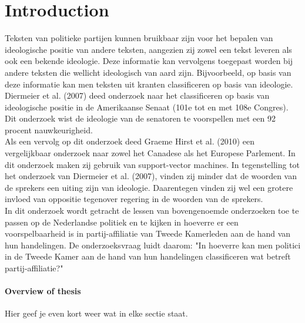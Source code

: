 \section{Introduction}
\label{sec:intro}
Teksten van politieke partijen kunnen bruikbaar zijn voor het bepalen van ideologische positie van andere teksten, aangezien zij zowel een tekst leveren als ook een bekende ideologie. Deze informatie kan vervolgens toegepast worden bij andere teksten die wellicht ideologisch van aard zijn. Bijvoorbeeld, op basis van deze informatie kan men teksten uit kranten classificeren op basis van ideologie.\\

Diermeier et al. (2007) deed onderzoek naar het classificeren op basis van ideologische positie in de Amerikaanse Senaat (101e tot en met 108e Congres). Dit onderzoek wist de ideologie van de senatoren te voorspellen met een 92 procent nauwkeurigheid.\\
Als een vervolg op dit onderzoek deed Graeme Hirst et al. (2010) een vergelijkbaar onderzoek naar zowel het Canadese als het Europese Parlement. \cite{Hirst_textto} In dit onderzoek maken zij gebruik van support-vector machines. In tegenstelling tot het onderzoek van Diermeier et al. (2007), vinden zij minder dat de woorden van de sprekers een uiting zijn van ideologie. Daarentegen vinden zij wel een grotere invloed van oppositie tegenover regering in de woorden van de sprekers.\\

In dit onderzoek wordt getracht de lessen van bovengenoemde onderzoeken toe te passen op de Nederlandse politiek en te kijken in hoeverre er een voorspelbaarheid is in partij-affiliatie van Tweede Kamerleden aan de hand van hun handelingen. De onderzoeksvraag luidt daarom: "In hoeverre kan men politici in de Tweede Kamer aan de hand van hun handelingen classificeren wat betreft partij-affiliatie?"


\paragraph{Overview of thesis}
Hier geef je even kort weer wat in elke sectie staat.
